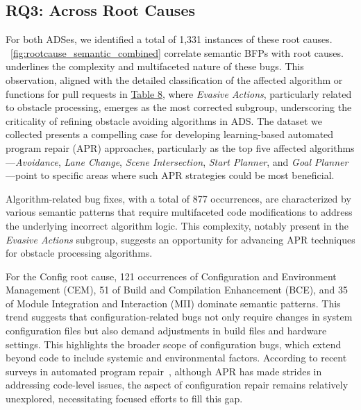 \subsection{\textbf{RQ3: \BFPs Across Root Causes}}

For both ADSes, we identified a total of 1,331 instances of these root causes.
~\autoref{fig:rootcause_semantic_combined} 
correlate semantic BFPs with root causes. 
underlines the complexity and multifaceted nature of these bugs.
This observation, aligned with the detailed classification of the affected algorithm or functions for pull requests in \hyperref[tab:algorithm_classification]{Table 8}, where \textit{Evasive Actions}, particularly related to obstacle processing, emerges as the most corrected subgroup, underscoring the criticality of refining obstacle avoiding algorithms in ADS.
The dataset we collected presents a compelling case for developing learning-based automated program repair (APR) approaches, particularly as the top five affected algorithms---\textit{Avoidance}, \textit{Lane Change}, \textit{Scene Intersection}, \textit{Start Planner}, and \textit{Goal Planner}---point to specific areas where such APR strategies could be most beneficial.

\vspace{-1ex}
\begin{finding}
\label{finding:rq3_alg}
        Algorithm-related bug fixes, with a total of 877 occurrences, are characterized by various semantic patterns that require multifaceted code modifications to address the underlying incorrect algorithm logic. This complexity, notably present in the \textit{Evasive Actions} subgroup, suggests an opportunity for advancing APR techniques for obstacle processing algorithms.
\end{finding}
\vspace{-1ex}
    

For the Config root cause, 
121 occurrences of Configuration and Environment Management (CEM), 51 of Build and Compilation Enhancement (BCE), and 35 of Module Integration and Interaction (MII) dominate semantic patterns. This trend suggests that configuration-related bugs not only require changes in system configuration files but also demand adjustments in build files and hardware settings. This highlights the broader scope of configuration bugs, which extend beyond code to include systemic and environmental factors.
According to recent surveys in automated program repair~\cite{apr_survey,ZhangFMSC24}, although APR has made strides in addressing code-level issues, the aspect of configuration repair remains relatively unexplored, necessitating focused efforts to fill this gap.

